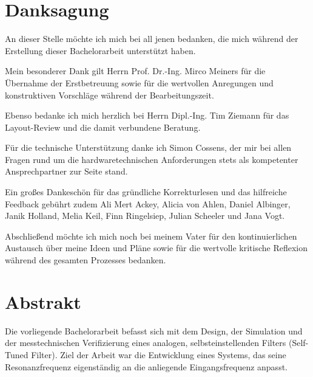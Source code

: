 \documentclass[a4paper,11pt]{book}
\begin{document}
\newpage
\null
\thispagestyle{empty} 


\clearpage{\pagestyle{empty}\cleardoublepage}
{} 










\clearpage{\pagestyle{empty}\cleardoublepage}
\chapter*{Danksagung}

An dieser Stelle möchte ich mich bei all jenen bedanken, die mich während der Erstellung dieser Bachelorarbeit unterstützt haben.\par
\medskip
Mein besonderer Dank gilt Herrn Prof. Dr.-Ing. Mirco Meiners für die Übernahme der Erstbetreuung sowie für die wertvollen Anregungen und konstruktiven Vorschläge während der Bearbeitungszeit.\par
\medskip
Ebenso bedanke ich mich herzlich bei Herrn Dipl.-Ing. Tim Ziemann für das Layout-Review und die damit verbundene Beratung.\par
\medskip
Für die technische Unterstützung danke ich Simon Cossens, der mir bei allen Fragen rund um die hardwaretechnischen Anforderungen stets als kompetenter Ansprechpartner zur Seite stand.\par
\medskip
Ein großes Dankeschön für das gründliche Korrekturlesen und das hilfreiche Feedback gebührt zudem Ali Mert Ackey, Alicia von Ahlen, Daniel Albinger, Janik Holland, Melia Keil, Finn Ringelsiep, Julian Scheeler und Jana Vogt.\par
\medskip
Abschließend möchte ich mich noch bei meinem Vater für den kontinuierlichen Austausch über meine Ideen und Pläne sowie für die wertvolle kritische Reflexion während des gesamten Prozesses bedanken. 



\clearpage{\pagestyle{empty}\cleardoublepage}
\chapter*{Abstrakt}
Die vorliegende Bachelorarbeit befasst sich mit dem Design, der Simulation und der messtechnischen Verifizierung eines analogen, selbsteinstellenden Filters (Self-Tuned Filter). Ziel der Arbeit war die Entwicklung eines Systems, das seine Resonanzfrequenz eigenständig an die anliegende Eingangsfrequenz anpasst. \par
\medskip
\end{document}
